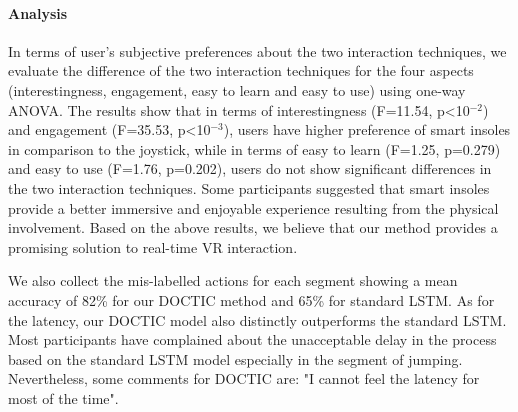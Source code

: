 \documentclass[review]{vgtc}                 %
\begin{document}
\paragraph{Analysis} In terms of user's subjective preferences about the two interaction techniques, we evaluate the difference of the two interaction techniques for the four aspects (interestingness, engagement, easy to learn and easy to use) using one-way ANOVA. 
The results show that in terms of interestingness (F=11.54, p<10$^{-2}$) and engagement (F=35.53, p<10$^{-3}$), users have higher preference of smart insoles in comparison to the joystick, while in terms of easy to learn (F=1.25, p=0.279) and easy to use (F=1.76, p=0.202), users do not show significant differences in the two interaction techniques.
Some participants suggested that smart insoles provide a better immersive and enjoyable experience resulting from the physical involvement.
Based on the above results, we believe that our method provides a promising solution to real-time VR interaction.

We also collect the mis-labelled actions for each segment showing a mean accuracy of 82\% for our DOCTIC method and 65\% for standard LSTM. 
As for the latency, our DOCTIC model also distinctly outperforms the standard LSTM. 
Most participants have complained about the unacceptable delay in the process based on the standard LSTM model especially in the segment of jumping. Nevertheless, some comments for DOCTIC are: "I cannot feel the latency for most of the time". 
\end{document}
